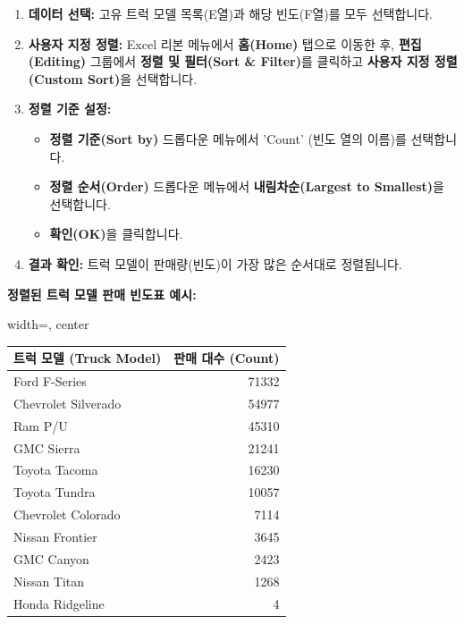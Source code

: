 \documentclass[11pt,a4paper]{article}
\theoremstyle{definition}
\begin{document}
\begin{enumerate}
    \item \textbf{데이터 선택:} 고유 트럭 모델 목록(E열)과 해당 빈도(F열)를 모두 선택합니다.
    \item \textbf{사용자 지정 정렬:} Excel 리본 메뉴에서 \textbf{홈(Home)} 탭으로 이동한 후, \textbf{편집(Editing)} 그룹에서 \textbf{정렬 및 필터(Sort \& Filter)}를 클릭하고 \textbf{사용자 지정 정렬(Custom Sort)}을 선택합니다.
    \item \textbf{정렬 기준 설정:}
    \begin{itemize}
        \item \textbf{정렬 기준(Sort by)} 드롭다운 메뉴에서 'Count' (빈도 열의 이름)를 선택합니다.
        \item \textbf{정렬 순서(Order)} 드롭다운 메뉴에서 \textbf{내림차순(Largest to Smallest)}을 선택합니다.
        \item \textbf{확인(OK)}을 클릭합니다.
    \end{itemize}
    \item \textbf{결과 확인:} 트럭 모델이 판매량(빈도)이 가장 많은 순서대로 정렬됩니다.
\end{enumerate}

\begin{examplebox}
\textbf{정렬된 트럭 모델 판매 빈도표 예시:}
\begin{adjustbox}{width=\textwidth, center}
\begin{tabular}{lr}
\toprule
\textbf{트럭 모델 (Truck Model)} & \textbf{판매 대수 (Count)} \\
\midrule
Ford F-Series & 71332 \\
Chevrolet Silverado & 54977 \\
Ram P/U & 45310 \\
GMC Sierra & 21241 \\
Toyota Tacoma & 16230 \\
Toyota Tundra & 10057 \\
Chevrolet Colorado & 7114 \\
Nissan Frontier & 3645 \\
GMC Canyon & 2423 \\
Nissan Titan & 1268 \\
Honda Ridgeline & 4 \\
\bottomrule
\end{tabular}
\end{adjustbox}
\end{examplebox}
\end{document}
